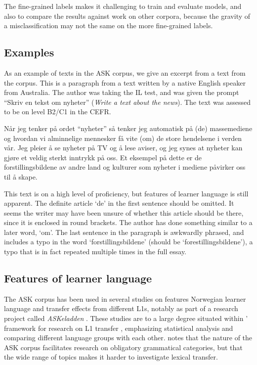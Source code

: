 The fine-grained labels makes it challenging to train and evaluate models,
and also to compare the results against work on other corpora, because the
gravity of a misclassification may not the same on the more fine-grained
labels.


\subsection{Examples}

As an example of texts in the ASK corpus, we give an excerpt from a text from
the corpus. This is a paragraph from a text written by a native English
speaker from Australia. The author was taking the IL test, and was given the
prompt ``Skriv en tekst om nyheter'' (\emph{Write a text about the news}).
The text was assessed to be on level B2/C1 in the \ac{CEFR}.

\begin{displayquote}  %
  Når jeg tenker på ordet ``nyheter'' så tenker jeg automatisk på (de)
  massemediene og hvordan vi alminnelige mennesker få vite (om) de store
  hendelsene i verden vår. Jeg pleier å se nyheter på TV og å lese aviser, og
  jeg synes at nyheter kan gjøre et veldig sterkt inntrykk på oss. Et
  eksempel på dette er de forstillingsbildene av andre land og kulturer som
  nyheter i mediene påvirker oss til å skape.
\end{displayquote}

This text is on a high level of proficiency, but features of learner language
is still apparent. The definite article `de' in the first sentence should be
omitted. It seems the writer may have been unsure of whether this article
should be there, since it is enclosed in round brackets. The author has done
something similar to a later word, `om'. The last sentence in the paragraph
is awkwardly phrased, and includes a typo in the word `forstillingsbildene'
(should be `forestillingsbildene'), a typo that is in fact repeated multiple
times in the full essay.


\subsection{Features of learner language}

The ASK corpus has been used in several studies on features Norwegian learner
language and transfer effects from different \acp{L1}, notably as part of a
research project called \emph{ASKeladden} \autocite{goldentenfjord2015}.
These studies are to a large degree situated within
\citeauthor{jarvis2000methodological}' framework for research on \ac{L1}
transfer \autocite{jarvis2000methodological}, emphasizing statistical
analysis and comparing different language groups with each other.
\textcite{goldentenfjord2015} notes that the nature of the ASK corpus
facilitates research on obligatory grammatical categories, but that the wide
range of topics makes it harder to investigate lexical transfer.


